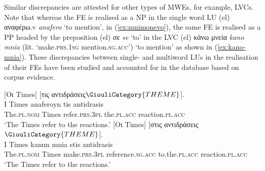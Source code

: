 \documentclass[output=paper,colorlinks,citecolor=brown]{langscibook}
\begin{document}
\begin{sloppypar}
\noindent
Similar discrepancies are attested for other types of MWEs, for example, LVCs. Note that whereas the FE  is realised as a NP in the single word LU (el) {αναφέρω}.v \textit{anafero} ‘to mention’, in (\ref{ex:mnimonevo}), the same FE is realised as a PP headed by the preposition (el) σε \textit{se} ‘to’ in the LVC (el) {{κάνω μνεία}} \textit{kano mnia} (lit. ‘make.\textsc{prs.1sg} mention.\textsc{sg.acc}’) ‘to mention’ as shown in (\ref{ex:kano-mnia}).
These discrepancies between single- and multiword LUs in the realisation of their FEs have been studied and accounted for in the database based on corpus evidence.
\end{sloppypar}

\ea
\label{ex:mnimonevo}
\glll
$[$Οι Times$]$  $[$τις αντιδράσεις$\GiouliCategory{THEME}$$]$. \\
I Times anaferoyn tis antidrasis \\
The.\textsc{pl.nom} Times refer.\textsc{prs.3pl} the.\textsc{pl.acc} reaction.\textsc{pl.acc} \\
\glt ‘The Times refer to the reactions.’
\ex
\label{ex:kano-mnia}
\glll
$[$Οι Times$]$   $[$στις αντιδράσεις$\GiouliCategory{THEME}$$]$. \\
I Times kanun mnia stis antidrasis \\
The.\textsc{pl.nom} Times make.\textsc{prs.3pl} reference.\textsc{sg.acc} to.the.\textsc{pl.acc} reaction.\textsc{pl.acc} \\
\glt ‘The Times refer to the reactions.’
\z
\end{document}

